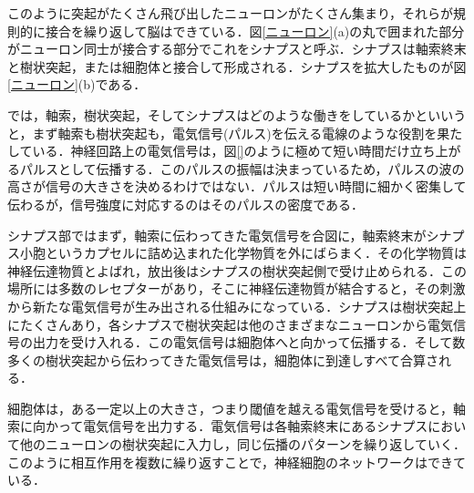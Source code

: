 \documentclass[a4paper,11pt]{jsreport}
\begin{document}
このように突起がたくさん飛び出したニューロンがたくさん集まり，それらが規則的に接合を繰り返して脳はできている．図\ref{ニューロン}(a)の丸で囲まれた部分がニューロン同士が接合する部分でこれをシナプスと呼ぶ．シナプスは軸索終末と樹状突起，または細胞体と接合して形成される．シナプスを拡大したものが図\ref{ニューロン}(b)である．\par
では，軸索，樹状突起，そしてシナプスはどのような働きをしているかといいうと，まず軸索も樹状突起も，電気信号(パルス)を伝える電線のような役割を果たしている．神経回路上の電気信号は，図\ref{}のように極めて短い時間だけ立ち上がるパルスとして伝播する．このパルスの振幅は決まっているため，パルスの波の高さが信号の大きさを決めるわけではない．パルスは短い時間に細かく密集して伝わるが，信号強度に対応するのはそのパルスの密度である．\par
シナプス部ではまず，軸索に伝わってきた電気信号を合図に，軸索終末がシナプス小胞というカプセルに詰め込まれた化学物質を外にばらまく．その化学物質は神経伝達物質とよばれ，放出後はシナプスの樹状突起側で受け止められる．この場所には多数のレセプターがあり，そこに神経伝達物質が結合すると，その刺激から新たな電気信号が生み出される仕組みになっている．シナプスは樹状突起上にたくさんあり，各シナプスで樹状突起は他のさまざまなニューロンから電気信号の出力を受け入れる．この電気信号は細胞体へと向かって伝播する．そして数多くの樹状突起から伝わってきた電気信号は，細胞体に到達しすべて合算される．\par
細胞体は，ある一定以上の大きさ，つまり閾値を越える電気信号を受けると，軸索に向かって電気信号を出力する．電気信号は各軸索終末にあるシナプスにおいて他のニューロンの樹状突起に入力し，同じ伝播のパターンを繰り返していく．このように相互作用を複数に繰り返すことで，神経細胞のネットワークはできている．
\end{document}
